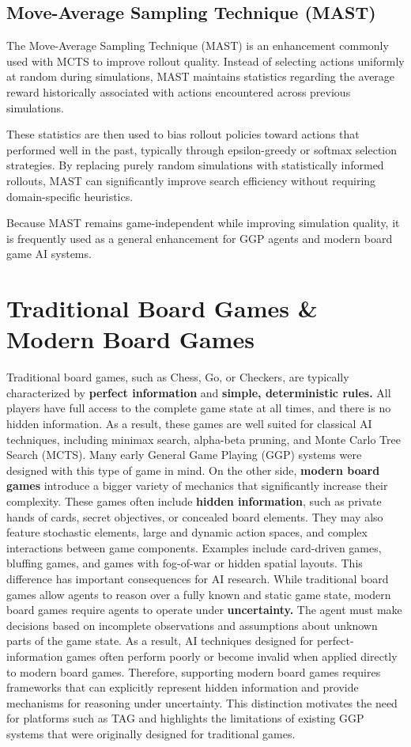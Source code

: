 \subsection{Move-Average Sampling Technique (MAST)}
The Move-Average Sampling Technique (MAST)\cite{chaslot2008progressive} is an enhancement commonly used with MCTS to improve rollout quality. Instead of selecting actions uniformly at random during simulations, MAST maintains statistics regarding the average reward historically associated with actions encountered across previous simulations.

These statistics are then used to bias rollout policies toward actions that performed well in the past, typically through epsilon-greedy or softmax selection strategies. By replacing purely random simulations with statistically informed rollouts, MAST can significantly improve search efficiency without requiring domain-specific heuristics.

Because MAST remains game-independent while improving simulation quality, it is frequently used as a general enhancement for GGP agents and modern board game AI systems.

\section{Traditional Board Games \& Modern Board Games}
Traditional board games, such as Chess, Go, or Checkers, are typically characterized by \textbf{perfect information} and \textbf{simple, deterministic rules.} All players have full access to the complete game state at all times, and there is no hidden information. As a result, these games are well suited for classical AI techniques, including minimax search, alpha-beta pruning, and Monte Carlo Tree Search (MCTS)\cite{russell2020artificial}. Many early General Game Playing (GGP) systems were designed with this type of game in mind\cite{Genesereth2005GeneralGP}. On the other side, \textbf{modern board games} introduce a bigger variety of mechanics that significantly increase their complexity. These games often include \textbf{hidden information}, such as private hands of cards, secret objectives, or concealed board elements. They may also feature stochastic elements, large and dynamic action spaces, and complex interactions between game components. Examples include card-driven games, bluffing games, and games with fog-of-war or hidden spatial layouts. This difference has important consequences for AI research. While traditional board games allow agents to reason over a fully known and static game state, modern board games require agents to operate under \textbf{uncertainty.} The agent must make decisions based on incomplete observations and assumptions about unknown parts of the game state. As a result, AI techniques designed for perfect-information games often perform poorly or become invalid when applied directly to modern board games. Therefore, supporting modern board games requires frameworks that can explicitly represent hidden information and provide mechanisms for reasoning under uncertainty. This distinction motivates the need for platforms such as TAG and highlights the limitations of existing GGP systems that were originally designed for traditional games.


